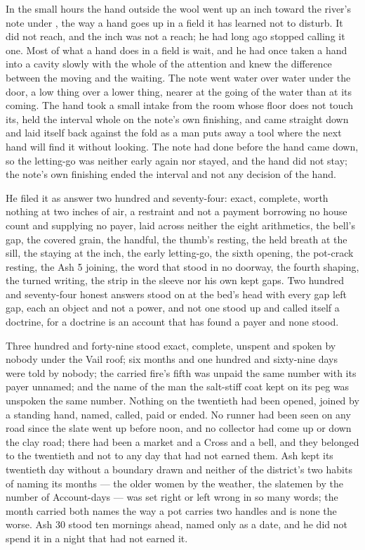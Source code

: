 \scenebreak

In the small hours the hand outside the wool went up an inch toward the river's note under , the way a hand goes up in a field it has learned not to disturb. It did not reach, and the inch was not a reach; he had long ago stopped calling it one. Most of what a hand does in a field is wait, and he had once taken a hand into a cavity slowly with the whole of the attention and knew the difference between the moving and the waiting. The note went water over water under the door, a low thing over a lower thing, nearer at the going of the water than at its coming. The hand took a small intake from the room whose floor does not touch its, held the interval whole on the note's own finishing, and came straight down and laid itself back against the fold as a man puts away a tool where the next hand will find it without looking. The note had done before the hand came down, so the letting-go was neither early again nor stayed, and the hand did not stay; the note's own finishing ended the interval and not any decision of the hand.

He filed it as answer two hundred and seventy-four: exact, complete, worth nothing at two inches of air, a restraint and not a payment borrowing no house count and supplying no payer, laid across neither the eight arithmetics, the bell's gap, the covered grain, the handful, the thumb's resting, the held breath at the sill, the staying at the inch, the early letting-go, the sixth opening, the pot-crack resting, the Ash 5 joining, the word that stood in no doorway, the fourth shaping, the turned writing, the strip in the sleeve nor his own kept gaps. Two hundred and seventy-four honest answers stood on  at the bed's head with every gap left gap, each an object and not a power, and not one stood up and called itself a doctrine, for a doctrine is an account that has found a payer and none stood.

Three hundred and forty-nine stood exact, complete, unspent and spoken by nobody under the Vail roof; six months and one hundred and sixty-nine days were told by nobody; the carried fire's fifth was unpaid the same number with its payer unnamed; and the name of the man the salt-stiff coat kept on its peg was unspoken the same number. Nothing on the twentieth had been opened, joined by a standing hand, named, called, paid or ended. No runner had been seen on any road since the slate went up before noon, and no collector had come up or down the clay road; there had been a market and a Cross and a bell, and they belonged to the twentieth and not to any day that had not earned them. Ash kept its twentieth day without a boundary drawn and neither of the district's two habits of naming its months --- the older women by the weather, the slatemen by the number of Account-days --- was set right or left wrong in so many words; the month carried both names the way a pot carries two handles and is none the worse. Ash 30 stood ten mornings ahead, named only as a date, and he did not spend it in a night that had not earned it.

